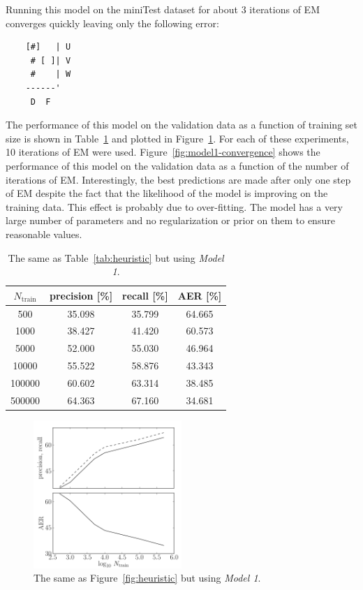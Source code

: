 \documentclass[11pt]{article}
\newcommand{\Fig}[1]{Figure~\ref{fig:#1}}
\newcommand{\fig}[1]{Figure~\ref{fig:#1}}
\newcommand{\figlabel}[1]{\label{fig:#1}}
\newcommand{\code}[1]{{\sffamily #1}}
\begin{document}
Running this model on the \code{miniTest} dataset for about 3 iterations of
EM converges quickly leaving only the following error:
\begin{lstlisting}
    [#]   | U
     # [ ]| V
     #    | W
    ------'
     D  F
\end{lstlisting}
The performance of this model on the validation data as a function of training
set size is shown in Table~\ref{tab:model1} and plotted in \fig{model1}.
For each of these experiments, 10 iterations of EM were used.
\Fig{model1-convergence} shows the performance of this model on the validation
data as a function of the number of iterations of EM.
Interestingly, the best predictions are made after only one step of EM despite
the fact that the likelihood of the model is improving on the training data.
This effect is probably due to over-fitting.
The model has a very large number of parameters and no regularization or prior
on them to ensure reasonable values.

\begin{table}[htbp]
\begin{center}
\begin{tabular}{c ccc}
\toprule
$N_\mathrm{train}$ & precision [\%] & recall [\%] & AER [\%] \\\midrule
500 & 35.098 & 35.799 & 64.665 \\
1000 & 38.427 & 41.420 & 60.573 \\
5000 & 52.000 & 55.030 & 46.964 \\
10000 & 55.522 & 58.876 & 43.343 \\
100000 & 60.602 & 63.314 & 38.485 \\
500000 & 64.363 & 67.160 & 34.681 \\
\bottomrule
\end{tabular}
\end{center}
\caption{%
The same as Table~\ref{tab:heuristic} but using \emph{Model 1}.
\label{tab:model1}}
\end{table}

\begin{figure}[htbp]
\begin{center}
    \includegraphics[width=0.5\textwidth]{model1.pdf}
\end{center}
\caption{%
The same as \fig{heuristic} but using \emph{Model 1}.
\figlabel{model1}}
\end{figure}
\end{document}
